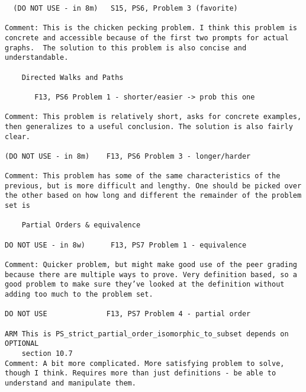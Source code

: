 \documentclass[handout]{mcs}
\begin{document}
\begin{staffnotes}
\begin{verbatim}
  (DO NOT USE - in 8m)   S15, PS6, Problem 3 (favorite)

Comment: This is the chicken pecking problem. I think this problem is
concrete and accessible because of the first two prompts for actual
graphs.  The solution to this problem is also concise and
understandable.

    Directed Walks and Paths

       F13, PS6 Problem 1 - shorter/easier -> prob this one

Comment: This problem is relatively short, asks for concrete examples,
then generalizes to a useful conclusion. The solution is also fairly
clear.

(DO NOT USE - in 8m)    F13, PS6 Problem 3 - longer/harder

Comment: This problem has some of the same characteristics of the
previous, but is more difficult and lengthy. One should be picked over
the other based on how long and different the remainder of the problem
set is

    Partial Orders & equivalence

DO NOT USE - in 8w)      F13, PS7 Problem 1 - equivalence

Comment: Quicker problem, but might make good use of the peer grading
because there are multiple ways to prove. Very definition based, so a
good problem to make sure they’ve looked at the definition without
adding too much to the problem set.

DO NOT USE              F13, PS7 Problem 4 - partial order

ARM This is PS_strict_partial_order_isomorphic_to_subset depends on OPTIONAL
    section 10.7
Comment: A bit more complicated. More satisfying problem to solve,
though I think. Requires more than just definitions - be able to
understand and manipulate them.
\end{verbatim}
\end{staffnotes}







\end{document}
